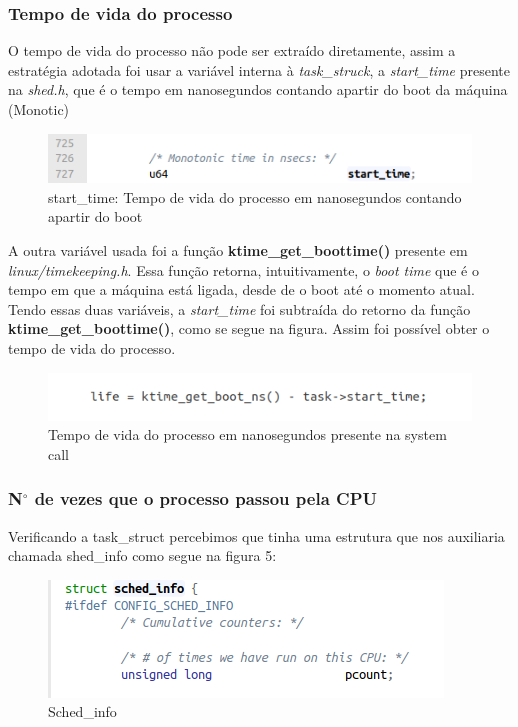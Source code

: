 \documentclass[12pt]{article}
\begin{document}
\subsubsection*{Tempo de vida do processo}
O tempo de vida do processo não pode ser extraído diretamente, assim a estratégia adotada foi usar a  variável interna à \textit{task\_struck}, a \textit{start\_time} presente na \textit{shed.h}, que é o tempo em nanosegundos contando apartir do boot da máquina (Monotic) \cite{robertlinux}
 \begin{figure}[!htb]
	\centering
	\includegraphics{imagens/start.png} 
	\caption{start\_time: Tempo de vida do processo em nanosegundos contando apartir do boot}
	\label{start}
\end{figure}
A outra variável usada foi a função  \textbf{ktime\_get\_boottime()} presente em \textit{linux/timekeeping.h}. Essa função retorna, intuitivamente, o \textit{boot time} que é o tempo em que a máquina está ligada, desde de o boot até o momento atual. Tendo essas duas variáveis, a \textit{start\_time} foi subtraída do retorno da função \textbf{ktime\_get\_boottime()}, como se segue na figura. Assim foi possível obter o tempo de vida do processo. 
 \begin{figure}[!htb]
	\centering
	\includegraphics{imagens/life.png} 
	\caption{Tempo de vida do processo em nanosegundos presente na system call}
	\label{start}
\end{figure}
\subsubsection*{N$^{\circ}$  de vezes que o processo passou pela CPU}
	Verificando a task\_struct percebimos que tinha uma estrutura que nos auxiliaria chamada shed\_info como segue na figura 5:
 
 \begin{figure}[!htb]
	\centering
\includegraphics[scale=0.7]{imagens/shed_info.png} 
	\caption{Sched\_info}
	\label{schedinf}
\end{figure}	
\end{document}
